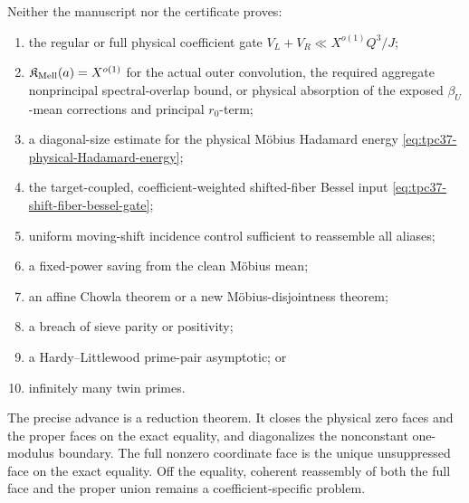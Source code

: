 Neither the manuscript nor the certificate proves:
\begin{enumerate}[label=(\roman*)]
 \item the regular or full physical coefficient gate
 \(V_L+V_R\ll X^{o(1)}Q^3/J\);
 \item \(\mathfrak K_{\rm Mell}(a)=X^{o(1)}\) for the actual outer
 convolution, the required aggregate nonprincipal spectral-overlap bound,
 or physical absorption of the exposed \(\beta_U\)-mean corrections and
 principal \(r_0\)-term;
 \item a diagonal-size estimate for the physical M\"obius Hadamard energy
 \eqref{eq:tpc37-physical-Hadamard-energy};
 \item the target-coupled, coefficient-weighted shifted-fiber Bessel input
 \eqref{eq:tpc37-shift-fiber-bessel-gate};
 \item uniform moving-shift incidence control sufficient to reassemble
 all aliases;
 \item a fixed-power saving from the clean M\"obius mean;
 \item an affine Chowla theorem or a new M\"obius-disjointness theorem;
 \item a breach of sieve parity or positivity;
 \item a Hardy--Littlewood prime-pair asymptotic; or
 \item infinitely many twin primes.
\end{enumerate}

The precise advance is a reduction theorem.  It closes the physical zero
faces and the proper faces on the exact equality, and diagonalizes the
nonconstant one-modulus boundary.  The full nonzero coordinate face is
the unique unsuppressed face on the exact equality.  Off the equality,
coherent reassembly of both the full face and the proper union remains a
coefficient-specific problem.

